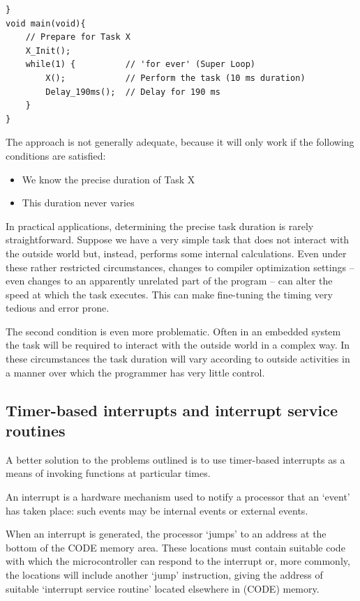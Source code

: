 \documentclass[twoside, final]{hcmut_report}
\begin{document}
\begin{lstlisting}[basicstyle=\small, caption= Trying to use the Super Loop architecture to execute tasks at regular intervals, label = {program_super_loop}]
}
void main(void){
    // Prepare for Task X
    X_Init();
    while(1) {          // 'for ever' (Super Loop)
        X();            // Perform the task (10 ms duration)
        Delay_190ms();  // Delay for 190 ms
    } 
}
\end{lstlisting}

The approach is not generally adequate, because it will only work if the following conditions are satisfied:
\begin{itemize}
    \item We know the precise duration of Task X
    \item This duration never varies
\end{itemize}

In practical applications, determining the precise task duration is rarely straightforward. Suppose we have a very simple task that does not interact with the outside
world but, instead, performs some internal calculations. Even under these rather
restricted circumstances, changes to compiler optimization settings – even changes to
an apparently unrelated part of the program – can alter the speed at which the task
executes. This can make fine-tuning the timing very tedious and error prone.

The second condition is even more problematic. Often in an embedded system the
task will be required to interact with the outside world in a complex way. In these circumstances the task duration will vary according to outside activities in a manner
over which the programmer has very little control.


\subsection{Timer-based interrupts and interrupt service routines}
A better solution to the problems outlined is to use timer-based interrupts as a means
of invoking functions at particular times.

An interrupt is a hardware mechanism used to notify a processor that an ‘event’ has taken place: such events may be internal events or external events.


When an interrupt is generated, the processor ‘jumps’ to an address at the bottom
of the CODE memory area. These locations must contain suitable code with which
the microcontroller can respond to the interrupt or, more commonly, the locations
will include another ‘jump’ instruction, giving the address of suitable ‘interrupt service routine’ located elsewhere in (CODE) memory.
\end{document}
